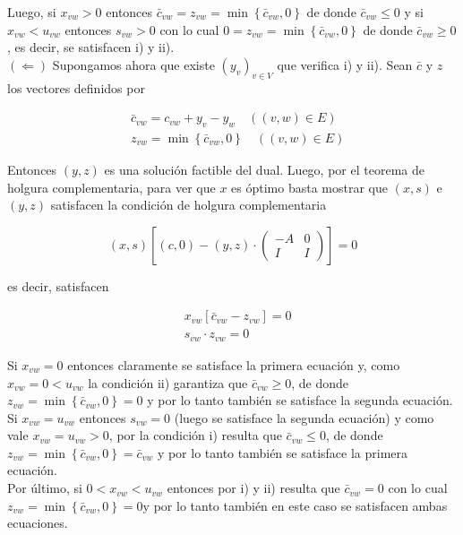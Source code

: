 \documentclass[10pt]{article}
\begin{document}
Luego, si $x_{v w}>0$ entonces $\bar{c}_{v w}=z_{v w}=\min \left\{\bar{c}_{v w}, 0\right\}$ de donde $\bar{c}_{v w} \leq 0$ y si $x_{v w}<u_{v w}$ entonces $s_{v w}>0$ con lo cual $0=z_{v w}=\min \left\{\bar{c}_{v w}, 0\right\}$ de donde $\bar{c}_{v w} \geq 0$, es decir, se satisfacen i) y ii).\\
$(\Longleftarrow)$ Supongamos ahora que existe $\left(y_{v}\right)_{v \in V}$ que verifica i) y ii). Sean $\bar{c}$ y $z$ los vectores definidos por

$$
\begin{aligned}
& \bar{c}_{v w}=c_{v w}+y_{v}-y_{w} \quad((v, w) \in E) \\
& z_{v w}=\min \left\{\bar{c}_{v w}, 0\right\} \quad((v, w) \in E)
\end{aligned}
$$

Entonces $(y, z)$ es una solución factible del dual. Luego, por el teorema de holgura complementaria, para ver que $x$ es óptimo basta mostrar que $(x, s)$ e $(y, z)$ satisfacen la condición de holgura complementaria

$$
(x, s)\left[(c, 0)-(y, z) \cdot\left(\begin{array}{cc}
-A & 0 \\
I & I
\end{array}\right)\right]=0
$$

es decir, satisfacen

$$
\begin{aligned}
& x_{v w}\left[\bar{c}_{v w}-z_{v w}\right]=0 \\
& s_{v w} \cdot z_{v w}=0
\end{aligned}
$$

Si $x_{v w}=0$ entonces claramente se satisface la primera ecuación y, como $x_{v w}=0<u_{v w}$ la condición ii) garantiza que $\bar{c}_{v w} \geq 0$, de donde $z_{v w}=\min \left\{\bar{c}_{v w}, 0\right\}=0$ y por lo tanto también se satisface la segunda ecuación.\\
Si $x_{v w}=u_{v w}$ entonces $s_{v w}=0$ (luego se satisface la segunda ecuación) y como vale $x_{v w}=u_{v w}>0$, por la condición i) resulta que $\bar{c}_{v w} \leq 0$, de donde $z_{v w}=\min \left\{\bar{c}_{v w}, 0\right\}=\bar{c}_{v w}$ y por lo tanto también se satisface la primera ecuación.\\
Por último, si $0<x_{v w}<u_{v w}$ entonces por i) y ii) resulta que $\bar{c}_{v w}=0$ con lo cual $z_{v w}=\min \left\{\bar{c}_{v w}, 0\right\}=0 \mathrm{y}$ por lo tanto también en este caso se satisfacen ambas ecuaciones.
\end{document}
